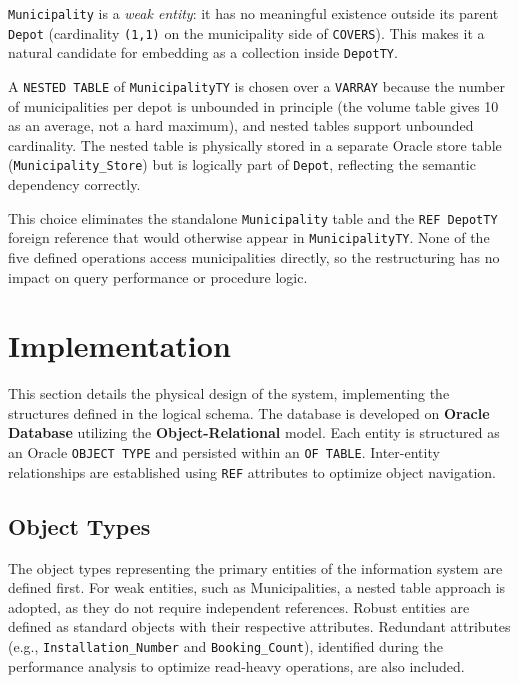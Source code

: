\documentclass[12pt]{article}
\begin{document}
\texttt{Municipality} is a \emph{weak entity}: it has no meaningful existence outside
its parent \texttt{Depot} (cardinality \texttt{(1,1)} on the municipality side of \texttt{COVERS}).
This makes it a natural candidate for embedding as a collection inside \texttt{DepotTY}.

A \texttt{NESTED TABLE} of \texttt{MunicipalityTY} is chosen over a \texttt{VARRAY} because
the number of municipalities per depot is unbounded in principle (the volume table gives
10 as an average, not a hard maximum), and nested tables support unbounded cardinality.
The nested table is physically stored in a separate Oracle store table
(\texttt{Municipality\_Store}) but is logically part of \texttt{Depot},
reflecting the semantic dependency correctly.

This choice eliminates the standalone \texttt{Municipality} table and the \texttt{REF DepotTY}
foreign reference that would otherwise appear in \texttt{MunicipalityTY}.
None of the five defined operations access municipalities directly,
so the restructuring has no impact on query performance or procedure logic.

\newpage
\section{Implementation}\label{sec:implementation}

This section details the physical design of the system, implementing the structures defined in the logical schema. The database is developed on \textbf{Oracle Database} utilizing the \textbf{Object-Relational} model. Each entity is structured as an Oracle \texttt{OBJECT TYPE} and persisted within an \texttt{OF TABLE}. Inter-entity relationships are established using \texttt{REF} attributes to optimize object navigation.

\subsection{Object Types}

The object types representing the primary entities of the information system are defined first. For weak entities, such as Municipalities, a nested table approach is adopted, as they do not require independent references. Robust entities are defined as standard objects with their respective attributes. Redundant attributes (e.g., \texttt{Installation\_Number} and \texttt{Booking\_Count}), identified during the performance analysis to optimize read-heavy operations, are also included.
\end{document}
